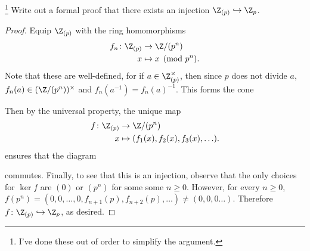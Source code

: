 \documentclass[10pt]{amsart}
\begin{document}
\setcounter{thm}{1}

\begin{thm}\footnote{I've done these out of order to simplify the argument.}
  Write out a formal proof that there exists an injection $\Z_{(p)} \hookrightarrow \Z_p$.
  
  \begin{proof}
    Equip $\Z_{(p)}$ with the ring homomorphisms
    \begin{align*}
      f_n \colon \Z_{(p)} &\rightarrow \Z/(p^n)\\
      x & \mapsto x \pmod{p^n}.
    \end{align*}
    Note that these are well-defined, for if $a \in \Z_{(p)}^\times$, then since $p$ does not divide $a$, $f_n(a) \in (\Z/(p^n))^\times$ and $f_n(a^{-1}) = f_n(a)^{-1}$.
    This forms the cone
    \begin{center}
    \end{center}
    Then by the universal property, the unique map
    \begin{align*}
      f \colon \Z_{(p)} &\rightarrow \Z/(p^n)\\
      x & \mapsto (f_1(x), f_2(x), f_3(x), \ldots).
    \end{align*}
    ensures that the diagram 
    \begin{center}
    \end{center}    
    commutes.
    Finally, to see that this is an injection, observe that the only choices for $\ker f$ are $(0)$ or $(p^n)$ for some some $n \geq 0$.
    However, for every $n \geq 0$, $f(p^n) = (0, 0, \ldots, 0, f_{n+1}(p), f_{n+2}(p), \ldots) \neq (0, 0, 0 \ldots)$.
    Therefore $f \colon \Z_{(p)} \hookrightarrow \Z_p$, as desired.
  \end{proof}
\end{thm}
\end{document}

